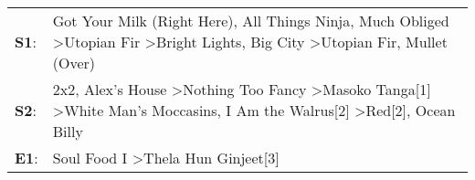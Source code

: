 \begin{supertabular}{p{0.03\textwidth}p{0.92\textwidth}}
 \textbf{S1}:  &                                  Got Your Milk (Right Here)\textsuperscript{}, \enspace All Things Ninja\textsuperscript{}, \enspace Much Obliged\textsuperscript{} \textgreater \enspace Utopian Fir\textsuperscript{} \textgreater \enspace Bright Lights, Big City\textsuperscript{} \textgreater \enspace Utopian Fir\textsuperscript{}, \enspace Mullet (Over)\textsuperscript{}  \enspace  \\
 \textbf{S2}:  &  2x2\textsuperscript{}, \enspace Alex's House\textsuperscript{} \textgreater \enspace Nothing Too Fancy\textsuperscript{} \textgreater \enspace Masoko Tanga[1]\textsuperscript{} \textgreater \enspace White Man's Moccasins\textsuperscript{}, \enspace I Am the Walrus[2]\textsuperscript{} \textgreater \enspace Red[2]\textsuperscript{}, \enspace Ocean Billy\textsuperscript{}  \enspace  \\
 \textbf{E1}:  &                                                                                                                                                                                                                                                                                            Soul Food I\textsuperscript{} \textgreater \enspace Thela Hun Ginjeet[3]\textsuperscript{}  \enspace  \\
\end{supertabular}
